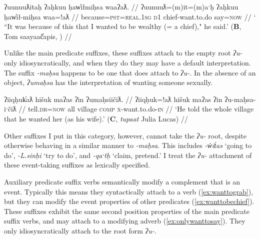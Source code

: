 \begin{comment}
TODO: EMB points out that below "want to" is attaching to causative

\ex \label{ex:wanttomakestrong}
\begingl
\glpreamble ʔunʔuuƛḥwaʔišʔaał ʔin ḥaaʔakmaḥsapsuuk m̓aam̓iiqsu. //
\gla ʔunʔuuƛ-(q)ḥ=waˑʔiš=ʔaał ʔin ḥaaʔak-maḥsa=!ap=suuk m̓aam̓iiqsu //
\glb because-\textsc{link}=\textsc{hrsy.3}=\textsc{habit} \textsc{comp} strong-want.to.do=\textsc{caus}=\textsc{neut.2pl} older.sibling //
\glft `It's because you want to make your older sibling strong.' (\textbf{C}, \textit{tupaat} Julia Lucas) //
\endgl
\xe
\end{comment}

\ex \label{ex:wanttobechief}
\begingl
\glpreamble ʔuunuuƛitaḥ ʔaḥkuu ḥaw̓iłmiḥsa waaʔaƛ. //
\gla ʔuunuuƛ=(m)it=(m)aˑḥ ʔaḥkuu ḥaw̓ił-miḥsa waa=!aƛ //
\glb because=\textsc{pst}=\textsc{real.1sg} \textsc{d1} chief-want.to.do say=\textsc{now} //
\glft ` ``It was because of this that I wanted to be wealthy (= a chief)," he said.' (\textbf{B}, Tom saayaač̓apis, \citealt[25]{sapir1955}) //
\endgl
\xe

Unlike the main predicate suffixes, these suffixes attach to the empty root \textit{ʔu-} only idiosyncratically, and when they do they may have a default interpretation. The suffix \textit{-maḥsa} happens to be one that does attach to \textit{ʔu-}. In the absence of an object, \textit{ʔumaḥsa} has the interpretation of wanting someone sexually.

\ex \label{ex:wanttomarry}
\begingl
\glpreamble ʔiiqḥuk̓aƛ hišuk maʔas ʔin ʔumaḥsiičiƛ. //
\gla ʔiiqḥuk=!aƛ hišuk maʔas ʔin ʔu-maḥsa-iˑčiƛ //
\glb tell.\textsc{dr}=\textsc{now} all village \textsc{comp} \textsc{x}-want.to.do-\textsc{in} //
\glft `He told the whole village that he wanted her (as his wife).' (\textbf{C}, \textit{tupaat} Julia Lucas) //
\endgl
\xe

Other suffixes I put in this category, however, cannot take the \textit{ʔu-} root, despite otherwise behaving in a similar manner to \textit{-maḥsa}. This includes \textit{-w̓it̓as} `going to do', \textit{-L.sinḥi} `try to do', and \textit{-qaˑtḥ} `claim, pretend.' I treat the \textit{ʔu-} attachment of these event-taking suffixes as lexically specified.

Auxiliary predicate suffix verbs semantically modify a complement that is an event. Typically this means they syntactically attach to a verb (\ref{ex:wanttograb}), but they can modify the event properties of other predicates (\ref{ex:wanttobechief}). These suffixes exhibit the same second position properties of the main predicate suffix verbs, and may attach to a modifying adverb (\ref{ex:onlywanttosay}). They only idiosyncratically attach to the root form \textit{ʔu-}.

